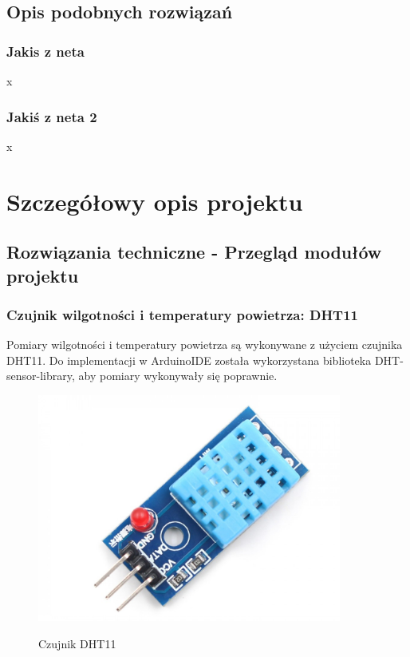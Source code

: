 \documentclass[12pt]{article}
\begin{document}
\subsection{Opis podobnych rozwiązań }
\subsubsection{Jakis z neta}
x
\subsubsection{Jakiś z neta 2}
x


\section{Szczegółowy opis projektu}


\subsection{Rozwiązania techniczne - Przegląd modułów projektu}
\subsubsection{Czujnik wilgotności i temperatury powietrza: DHT11}
Pomiary wilgotności i temperatury powietrza są wykonywane z użyciem czujnika DHT11. Do implementacji w ArduinoIDE została wykorzystana biblioteka DHT-sensor-library, aby pomiary wykonywały się poprawnie.
\begin{figure}[!h]
	\begin{center}
		{\includegraphics[width=10cm]{DHT11_photo.png}}
	\end{center}
	\caption{Czujnik DHT11}
\end{figure}
\end{document}
